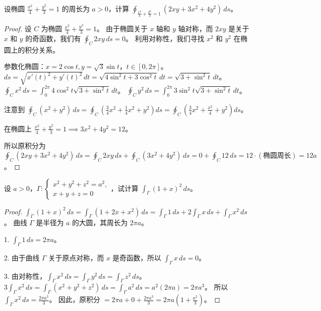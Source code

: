 \documentclass[lang=cn,10pt,thmcnt=section]{elegantbook}
\begin{document}
\begin{example}
	设椭圆 $\frac{x^2}{4} + \frac{y^2}{3} = 1$ 的周长为 $a > 0$，计算 $\oint_{\frac{x^2}{4} + \frac{y^2}{3} = 1} (2xy + 3x^2 + 4y^2) \, ds$。

\end{example}
\begin{proof}
	设 $C$ 为椭圆 $\frac{x^2}{4} + \frac{y^2}{3} = 1$。
由于椭圆关于 $x$ 轴和 $y$ 轴对称，而 $2xy$ 是关于 $x$ 和 $y$ 的奇函数，我们有 $\oint_C 2xy \, ds = 0$。
利用对称性，我们寻找 $x^2$ 和 $y^2$ 在椭圆上的积分关系。

参数化椭圆：$x = 2\cos t, y = \sqrt{3}\sin t$，$t \in [0, 2\pi]$。
$ds = \sqrt{x'(t)^2 + y'(t)^2} \, dt = \sqrt{4\sin^2 t + 3\cos^2 t} \, dt = \sqrt{3 + \sin^2 t} \, dt$。
$\oint_C x^2 \, ds = \int_0^{2\pi} 4\cos^2 t \sqrt{3+\sin^2 t} \, dt$。
$\oint_C y^2 \, ds = \int_0^{2\pi} 3\sin^2 t \sqrt{3+\sin^2 t} \, dt$。

注意到 $\oint_C (x^2 + y^2) \, ds = \oint_C (\frac{3}{4}x^2 + \frac{1}{4}x^2 + y^2) ds = \oint_C (\frac{3}{4}x^2 + \frac{x^2}{4} + y^2) ds$。

在椭圆上 $\frac{x^2}{4} + \frac{y^2}{3} = 1 \implies 3x^2+4y^2=12$。

所以原积分为 $\oint_C (2xy + 3x^2+4y^2) \, ds = \oint_C 2xy \, ds + \oint_C (3x^2+4y^2) \, ds = 0 + \oint_C 12 \, ds = 12 \cdot (\text{椭圆周长}) = 12a$。
 
\end{proof}
\begin{example}
	设 $a > 0$，$\Gamma: \left\{ \begin{array}{l} x^2 + y^2 + z^2 = a^2, \\ x + y + z = 0 \end{array} \right.$，试计算 $\int_{\Gamma} (1 + x)^2 \, ds$。
\end{example}

\begin{proof}
	
$\int_{\Gamma} (1 + x)^2 \, ds = \int_{\Gamma} (1 + 2x + x^2) \, ds = \int_{\Gamma} 1 \, ds + 2\int_{\Gamma} x \, ds + \int_{\Gamma} x^2 \, ds$。
曲线 $\Gamma$ 是半径为 $a$ 的大圆，其周长为 $2\pi a$。

1. $\int_{\Gamma} 1 \, ds = 2\pi a$。

2. 由于曲线 $\Gamma$ 关于原点对称，而 $x$ 是奇函数，所以 $\int_{\Gamma} x \, ds = 0$。

3. 由对称性，$\int_{\Gamma} x^2 \, ds = \int_{\Gamma} y^2 \, ds = \int_{\Gamma} z^2 \, ds$。
   $3\int_{\Gamma} x^2 \, ds = \int_{\Gamma} (x^2+y^2+z^2) \, ds = \int_{\Gamma} a^2 \, ds = a^2(2\pi a) = 2\pi a^3$。
   所以 $\int_{\Gamma} x^2 \, ds = \frac{2\pi a^3}{3}$。
因此，原积分 $= 2\pi a + 0 + \frac{2\pi a^3}{3} = 2\pi a(1 + \frac{a^2}{3})$。
\end{proof}
\end{document}
